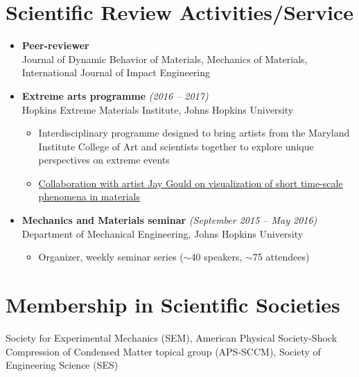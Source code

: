 \documentclass[a4paper,10pt, oneside]{article}
\begin{document}
	\section*{{Scientific Review Activities/Service}}
	\begin{itemize}[wide, labelwidth=!, labelindent=-1em]
		\item[] \textbf{Peer-reviewer} \\
		Journal of Dynamic Behavior of Materials, Mechanics of Materials, International Journal of Impact Engineering
		\vspace*{0.5em}
		\item[]\textbf{Extreme arts programme} \hfill \textit{(2016 -- 2017)} \\
		Hopkins Extreme Materials Institute, Johns Hopkins University
		\begin{itemize}[wide, labelwidth=!, labelindent=0em]
			\item Interdisciplinary programme designed to bring artists from the Maryland Institute College of Art and scientists together to explore unique perspectives on extreme events
			\item \href{https://www.youtube.com/watch?v=SQUqKc2duXA&feature=youtu.be&ab_channel=HEMI-HopkinsExtremeMaterialsInstitute}{Collaboration with artist Jay Gould on visualization of short time-scale phenomena in materials}
		\end{itemize}
		\vspace*{0.5em}
		\item[]\textbf{Mechanics and Materials seminar} \hfill \textit{(September 2015 -- May 2016)} \\
		Department of Mechanical Engineering, Johns Hopkins University
		\begin{itemize}[wide, labelwidth=!, labelindent=0em]
			\item Organizer, weekly seminar series ($\sim$40 speakers, $\sim$75 attendees)
		\end{itemize}
	\end{itemize}
	
	\section*{{Membership in Scientific Societies}}
	Society for Experimental Mechanics (SEM), American Physical Society-Shock Compression of Condensed Matter topical group (APS-SCCM), Society of Engineering Science (SES) 
		
\end{document}

